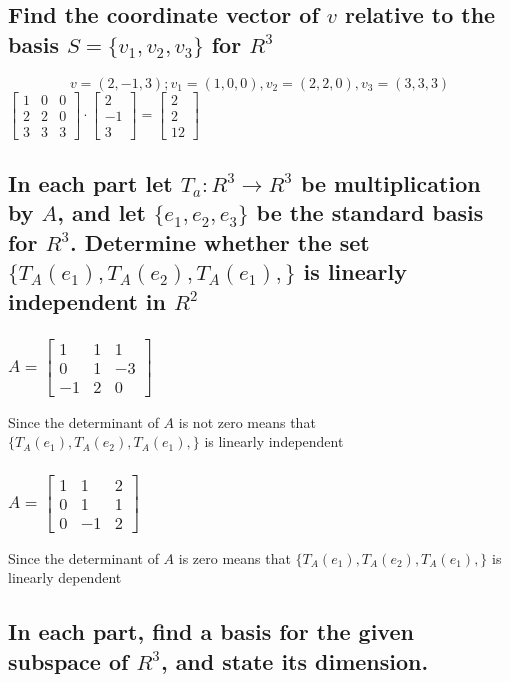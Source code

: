 \documentclass[12pt, a4paper]{article}
\begin{document}
		\subsection{Find the coordinate vector of $v$ relative to the basis $S=\{v_1,v_2,v_3\}$ for $R^3$}
			$$v=(2,-1,3);v_1=(1,0,0), v_2=(2,2,0),v_3=(3,3,3)$$
			$\begin{bmatrix} 1 & 0 & 0 \\ 2 & 2 & 0 \\ 3 & 3 & 3 \end{bmatrix}\cdot \begin{bmatrix} 2\\-1\\3 \end{bmatrix}=\begin{bmatrix} 2\\2\\12 \end{bmatrix}$
		\subsection{In each part let $T_a:R^3\rightarrow R^3$ be multiplication by $A$, and let $\{e_1,e_2,e_3\}$ be the standard basis for $R^3$. Determine whether the set $\{T_A(e_1),T_A(e_2),T_A(e_1),\}$ is linearly independent in $R^2$}
			\subsubsection{$A=\begin{bmatrix} 1 & 1 & 1 \\ 0 & 1 & -3\\ -1 & 2 & 0\end{bmatrix}$}
				Since the determinant of $A$ is not zero means that $\{T_A(e_1),T_A(e_2),T_A(e_1),\}$ is linearly independent
			\subsubsection{$A=\begin{bmatrix} 1 & 1 & 2 \\ 0 & 1 & 1\\ 0 & -1 & 2\end{bmatrix}$}
				Since the determinant of $A$ is zero means that $\{T_A(e_1),T_A(e_2),T_A(e_1),\}$ is linearly dependent
		\subsection{In each part, find a basis for the given subspace of $R^3$, and state its dimension.}
\end{document}
